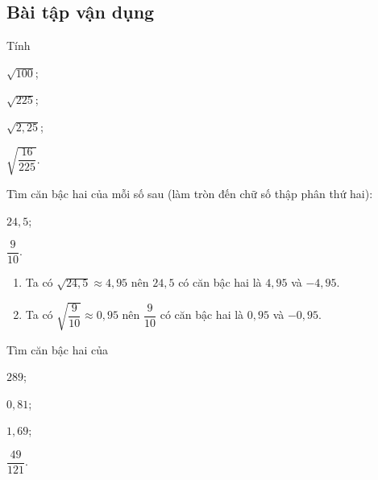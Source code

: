 \subsection{Bài tập vận dụng}
\begin{bt}
	Tính
	\begin{listEX}[4]
	\item $\sqrt{100}$;
	\item $\sqrt{225}$;
	\item $\sqrt{2{,}25}$;
	\item $\sqrt{\dfrac{16}{225}}$.
	\end{listEX}
\end{bt}
\begin{bt}
	Tìm căn bậc hai của mỗi số sau (làm tròn đến chữ số thập phân thứ hai):
	\begin{listEX}[2]
	\item $24{,}5$;
	\item $\dfrac{9}{10}$.
	\end{listEX}
	\loigiai
	{
	\begin{enumerate}
	\item Ta có $\sqrt{24{,}5}\approx 4{,}95$ nên $24{,}5$ có căn bậc hai là $4{,}95$ và $-4{,}95$.
	\item Ta có $\sqrt{\dfrac{9}{10}}\approx 0{,}95$ nên $\dfrac{9}{10}$ có căn bậc hai là $0{,}95$ và $-0{,}95$.
	\end{enumerate}	
	}
\end{bt}
\begin{bt}
	Tìm căn bậc hai của
	\begin{enumEX}{4}
	\item $289$;
	\item $0{,}81$;
	\item $1{,}69$;
	\item $\dfrac{49}{121}$.
	\end{enumEX}
\end{bt}
